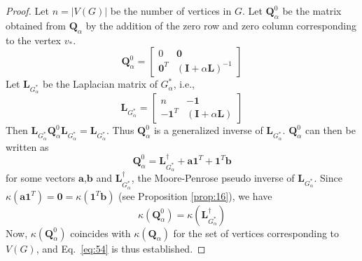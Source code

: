 \begin{proof}\citep{chebotarev02:_fores_metric_for_graph_vertic}
  Let $n = |V(G)|$ be the number of vertices in $G$. Let
  $\mathbf{Q}_{\alpha}^{0}$ be the matrix obtained from
  $\mathbf{Q}_{\alpha}$ by the addition of the zero row and zero
  column corresponding to the vertex $v_*$.
  \begin{equation}
    \label{eq:58}
    \mathbf{Q}_{\alpha}^{0}  =  \left[ \begin{array}{c|c}
        0 & \bm{0} \\ \hline
        \bm{0}^{T} & (\mathbf{I} + \alpha \mathbf{L})^{-1}
        \end{array} \right]
  \end{equation}
  Let $\mathbf{L}_{G_{\alpha}^{*}}$ be the Laplacian matrix of $G_{\alpha}^{*}$, i.e., 
  \begin{equation}
    \label{eq:57}
    \mathbf{L}_{G_{\alpha}^{*}} = \left[ \begin{array}{c|c}
        n & \bm{-1} \\ \hline
        \bm{-1}^{T} & (\mathbf{I} + \alpha \mathbf{L})
        \end{array} \right]
  \end{equation}
  Then $\mathbf{L}_{G_{\alpha}^{*}}\mathbf{Q}_{\alpha}^{0}\mathbf{L}_{G_{\alpha}^{*}} =
  \mathbf{L}_{G_{\alpha}^{*}}$. Thus $\mathbf{Q}_{\alpha}^{0}$ is a generalized
  inverse of $\mathbf{L}_{G_{\alpha}^{*}}$. $\mathbf{Q}_{\alpha}^{0}$ can then be
  written as 
  \begin{equation}
    \label{eq:59}
    \mathbf{Q}_{\alpha}^{0} = \mathbf{L}_{G_{\alpha}^{*}}^{\dagger} +
    \bm{a}\bm{1}^{T} + \bm{1}^{T}\bm{b}
  \end{equation}
  for some vectors $\bm{a}$,$\bm{b}$ and
  $\mathbf{L}_{G_{\alpha}^{*}}^{\dagger}$, the Moore-Penrose pseudo
  inverse of $\mathbf{L}_{G_{\alpha}^{*}}$. Since
  $\kappa(\bm{a}\bm{1}^{T}) = \mathbf{0} = \kappa(\bm{1}^{T}\bm{b})$
  (see Proposition \ref{prop:16}), we have
  \begin{equation}
    \label{eq:60}
    \kappa(\mathbf{Q}_{\alpha}^{0}) = \kappa(\mathbf{L}_{G_{\alpha}^{*}}^{\dagger})
  \end{equation}
  Now, $\kappa(\mathbf{Q}_{\alpha}^{0})$ coincides with
  $\kappa(\mathbf{Q}_{\alpha})$ for the set of vertices corresponding
  to $V(G)$, and Eq.~\eqref{eq:54} is thus established.
\end{proof}

